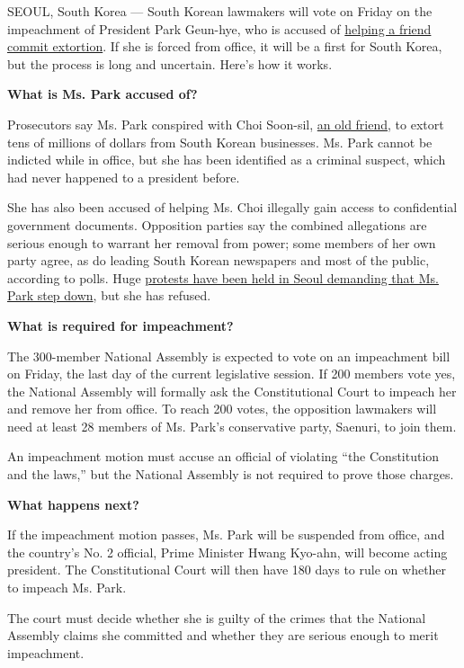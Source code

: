 SEOUL, South Korea --- South Korean lawmakers will vote on Friday on the
impeachment of President Park Geun-hye, who is accused of
\href{http://www.nytimes.com/2016/11/06/world/asia/south-koreans-ashamed-over-les-secretive-adviser.html}{helping
a friend commit extortion}. If she is forced from office, it will be a
first for South Korea, but the process is long and uncertain. Here's how
it works.

\textbf{What is Ms. Park accused of?}

Prosecutors say Ms. Park conspired with Choi Soon-sil,
\href{http://www.nytimes.com/2016/10/28/world/asia/south-korea-choi-soon-sil.html}{an
old friend}, to extort tens of millions of dollars from South Korean
businesses. Ms. Park cannot be indicted while in office, but she has
been identified as a criminal suspect, which had never happened to a
president before.

She has also been accused of helping Ms. Choi illegally gain access to
confidential government documents. Opposition parties say the combined
allegations are serious enough to warrant her removal from power; some
members of her own party agree, as do leading South Korean newspapers
and most of the public, according to polls. Huge
\href{http://www.nytimes.com/2016/11/26/world/asia/korea-park-geun-hye-protests.html}{protests
have been held in Seoul demanding that Ms. Park step down}, but she has
refused.

\textbf{What is required for impeachment?}

The 300-member National Assembly is expected to vote on an impeachment
bill on Friday, the last day of the current legislative session. If 200
members vote yes, the National Assembly will formally ask the
Constitutional Court to impeach her and remove her from office. To reach
200 votes, the opposition lawmakers will need at least 28 members of Ms.
Park's conservative party, Saenuri, to join them.

An impeachment motion must accuse an official of violating ``the
Constitution and the laws,'' but the National Assembly is not required
to prove those charges.

\textbf{What happens next?}

If the impeachment motion passes, Ms. Park will be suspended from
office, and the country's No. 2 official, Prime Minister Hwang Kyo-ahn,
will become acting president. The Constitutional Court will then have
180 days to rule on whether to impeach Ms. Park.

The court must decide whether she is guilty of the crimes that the
National Assembly claims she committed and whether they are serious
enough to merit impeachment.

